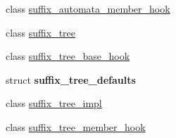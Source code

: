 \begin{DoxyCompactItemize}
\item 
class \hyperlink{classboost_1_1intrusive_1_1suffix__automata__member__hook}{suffix\+\_\+automata\+\_\+member\+\_\+hook}
\item 
class \hyperlink{classboost_1_1intrusive_1_1suffix__tree}{suffix\+\_\+tree}
\item 
class \hyperlink{classboost_1_1intrusive_1_1suffix__tree__base__hook}{suffix\+\_\+tree\+\_\+base\+\_\+hook}
\item 
struct {\bfseries suffix\+\_\+tree\+\_\+defaults}
\item 
class \hyperlink{classboost_1_1intrusive_1_1suffix__tree__impl}{suffix\+\_\+tree\+\_\+impl}
\item 
class \hyperlink{classboost_1_1intrusive_1_1suffix__tree__member__hook}{suffix\+\_\+tree\+\_\+member\+\_\+hook}
\end{DoxyCompactItemize}
